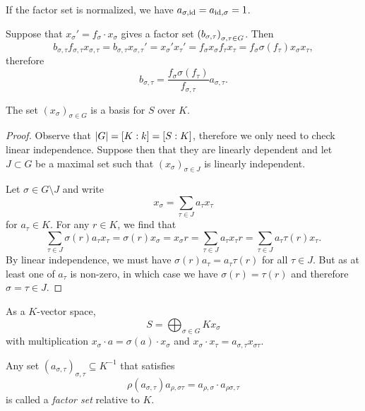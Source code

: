 \begin{opomba}
If the factor set is normalized, we have
$a_{\sigma, \operatorname{id}} = a_{\operatorname{id}, \sigma} = 1$.
\end{opomba}

\begin{opomba}
\label{brg:rmk:eq_cls}
Suppose that $x_\sigma' = f_\sigma \cdot x_\sigma$ gives a factor
set $\left(b_{\sigma, \tau}\right)_{\sigma, \tau \in G}$. Then
\[
b_{\sigma, \tau} f_{\sigma, \tau} x_{\sigma, \tau} =
b_{\sigma, \tau} x_{\sigma, \tau}' =
x_\sigma' x_\tau' =
f_\sigma x_\sigma f_\tau x_\tau =
f_\sigma \sigma(f_\tau) x_\sigma x_\tau,
\]
therefore
\[
b_{\sigma, \tau} =
\frac{f_\sigma \sigma(f_\tau)}{f_{\sigma, \tau}} a_{\sigma, \tau}.
\]
\end{opomba}

\begin{trditev}
The set $(x_\sigma)_{\sigma \in G}$ is a basis for $S$ over $K$.
\end{trditev}

\begin{proof}
Observe that $\left\lvert G\right\rvert = [K : k] = [S : K]$, therefore we only need
to check linear independence. Suppose then that they are linearly
dependent and let $J \subset G$ be a maximal set such that
$(x_\sigma)_{\sigma \in J}$ is linearly independent.

Let $\sigma \in G \setminus J$ and write
\[
x_\sigma = \sum_{\tau \in J} a_\tau x_\tau
\]
for $a_\tau \in K$. For any $r \in K$, we find that
\[
\sum_{\tau \in J} \sigma(r) a_\tau x_\tau =
\sigma(r) x_\sigma =
x_\sigma r =
\sum_{\tau \in J} a_\tau x_\tau r =
\sum_{\tau \in J} a_\tau \tau(r) x_\tau.
\]
By linear independence, we must have
$\sigma(r) a_\tau = a_\tau \tau(r)$ for all $\tau \in J$. But as
at least one of $a_\tau$ is non-zero, in which case we have
$\sigma(r) = \tau(r)$ and therefore $\sigma = \tau \in J$.
\end{proof}

\begin{posledica}
As a $K$-vector space,
\[
S = \bigoplus_{\sigma \in G} K x_{\sigma}
\]
with multiplication $x_\sigma \cdot a = \sigma(a) \cdot x_\sigma$
and $x_\sigma \cdot x_\tau = a_{\sigma, \tau} x_{\sigma \tau}$.
\end{posledica}

\begin{definicija}
Any set $(a_{\sigma, \tau})_{\sigma, \tau} \subseteq K^{-1}$ that
satisfies
\[
\rho(a_{\sigma, \tau}) a_{\rho, \sigma \tau} =
a_{\rho, \sigma} \cdot a_{\rho \sigma, \tau}
\]
is called a \emph{factor set} relative to $K$.
\end{definicija}

